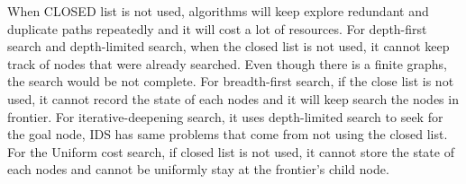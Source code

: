 \documentclass[12pt]{article}
\begin{document}
\begin{enumerate}
  When CLOSED list is not used, algorithms will keep explore redundant and duplicate paths repeatedly and it will cost a lot of resources. For depth-first search and depth-limited search, when the closed list is not used, it cannot keep track of nodes that were already searched. Even though there is a finite graphs, the search would be not complete. For breadth-first search, if the close list is not used, it cannot record the state of each nodes and it will keep search the nodes in frontier. For iterative-deepening search, it uses depth-limited search to seek for the goal node, IDS has same problems that come from not using the closed list. For the Uniform cost search, if closed list is not used, it cannot store the state of each nodes and cannot be uniformly stay at the frontier's child node.

\end{enumerate}
\end{document}
